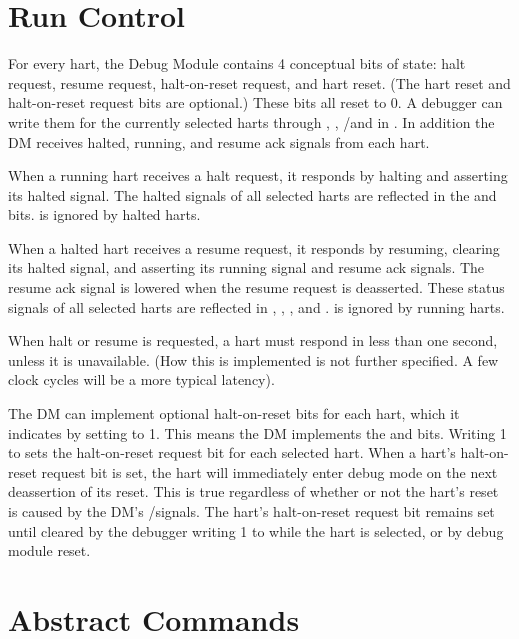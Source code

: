 \section{Run Control} \label{runcontrol}

For every hart, the Debug Module contains 4 conceptual bits of state: halt
request, resume request, halt-on-reset request,  and hart reset.
(The hart reset and halt-on-reset request bits are optional.)
These bits all reset to 0. A debugger can write them for the currently selected
harts through \Fhaltreq, \Fresumereq, \Fsetresethaltreq/\Fclrresethaltreq and \Fhartreset in \Rdmcontrol.
In addition the DM receives halted, running, and resume ack signals from each
hart.

When a running hart receives a halt request, it responds by halting and
asserting its halted signal. The halted signals of all selected harts are
reflected in the \Fallhalted and \Fanyhalted bits. \Fhaltreq is ignored by
halted harts.

When a halted hart receives a resume request, it responds by resuming, clearing
its halted signal, and asserting its running signal and resume ack signals. The
resume ack signal is lowered when the resume request is deasserted.  These
status signals of all selected harts are reflected in \Fallresumeack,
\Fanyresumeack, \Fallrunning, and \Fanyrunning. \Fresumereq is ignored by
running harts.

When halt or resume is requested, a hart must respond in
less than one second, unless it is unavailable.
(How this is implemented is not further specified. A few
clock cycles will be a more typical latency).

The DM can implement optional halt-on-reset bits for each hart,
which it indicates by setting \Fhasresethaltreq to 1.
This means the DM implements the \Fsetresethaltreq and \Fclrresethaltreq bits.
Writing 1 to \Fsetresethaltreq sets the halt-on-reset request bit for each
selected hart.
When a hart's halt-on-reset request bit is set, the hart will immediately enter
debug mode on the next deassertion of its reset. This is true regardless of
whether or not the hart's reset is caused by the DM's
\Fndmreset/\Fhartreset signals.
The hart's halt-on-reset request bit remains set
until cleared by the debugger writing 1 to \Fclrresethaltreq
while the hart is selected, or by debug module reset.

\section{Abstract Commands} \label{abstractcommands}

